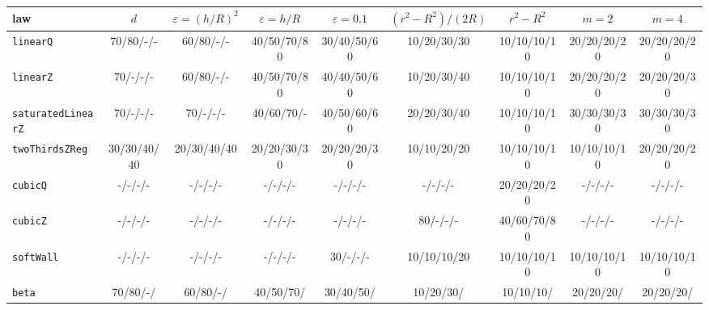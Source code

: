 \begin{tabular}{lcccccccc}
\toprule
law & $d$ & $\varepsilon=(h/R)^2$ & $\varepsilon=h/R$ & $\varepsilon=0.1$ & $(r^2-R^2)/(2R)$ & $r^2-R^2$ & $m=2$ & $m=4$ \\
\midrule
\texttt{linearQ} & 70/80/-/- & 60/80/-/- & 40/50/70/80 & 30/40/50/60 & 10/20/30/30 & 10/10/10/10 & 20/20/20/20 & 20/20/20/20 \\
\texttt{linearZ} & 70/-/-/- & 60/80/-/- & 40/50/70/80 & 40/40/50/60 & 10/20/30/40 & 10/10/10/10 & 20/20/20/20 & 20/20/20/30 \\
\texttt{saturatedLinearZ} & 70/-/-/- & 70/-/-/- & 40/60/70/- & 40/50/60/60 & 20/20/30/40 & 10/10/10/10 & 30/30/30/30 & 30/30/30/30 \\
\texttt{twoThirdsZReg} & 30/30/40/40 & 20/30/40/40 & 20/20/30/30 & 20/20/20/30 & 10/10/20/20 & 10/10/10/10 & 10/10/10/10 & 20/20/20/20 \\
\texttt{cubicQ} & -/-/-/- & -/-/-/- & -/-/-/- & -/-/-/- & -/-/-/- & 20/20/20/20 & -/-/-/- & -/-/-/- \\
\texttt{cubicZ} & -/-/-/- & -/-/-/- & -/-/-/- & -/-/-/- & 80/-/-/- & 40/60/70/80 & -/-/-/- & -/-/-/- \\
\texttt{softWall} & -/-/-/- & -/-/-/- & -/-/-/- & 30/-/-/- & 10/10/10/20 & 10/10/10/10 & 10/10/10/10 & 10/10/10/10 \\
\texttt{beta} & 70/80/-/ & 60/80/-/ & 40/50/70/ & 30/40/50/ & 10/20/30/ & 10/10/10/ & 20/20/20/ & 20/20/20/ \\
\bottomrule
\end{tabular}
